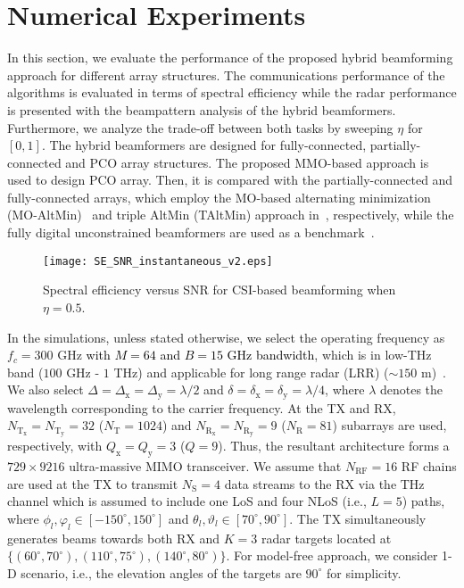 \documentclass[journal,10pt]{IEEEtran}
\begin{document}
	\section{Numerical Experiments}
	\label{sec:numexp}
	In this section, we evaluate the performance of the proposed hybrid beamforming approach for different array structures. The communications performance of the algorithms is evaluated in terms of spectral efficiency while the radar performance is presented with the beampattern analysis of the hybrid beamformers. Furthermore, we analyze the trade-off between both tasks by sweeping $\eta$ for $[0,1]$.  The hybrid beamformers are designed for fully-connected, partially-connected and PCO array structures. The proposed MMO-based approach is used to design PCO array. Then, it is compared with the partially-connected and fully-connected arrays, which employ the MO-based alternating minimization (MO-AltMin)~\cite{hybridBFAltMin} and triple AltMin (TAltMin) approach in~\cite{radarCommLiuICASSP2019}, respectively, while the fully digital unconstrained beamformers are used as a benchmark~\cite{heath2016overview}.
	
	\begin{figure}[t]
		\centering
		{\texttt{[image: SE\_SNR\_instantaneous\_v2.eps]} } 
		\caption{\color{black}Spectral efficiency versus SNR for CSI-based beamforming when $\eta = 0.5$. 
		}
		\label{fig_SE_SNR_ins}
	\end{figure}
	
	
	In the simulations, unless stated otherwise, we select the operating frequency as $f_c = 300$ GHz \textcolor{black}{with $M=64$ and $B=15$ GHz bandwidth}, which is in low-THz band ($100$ GHz - $1$ THz) and applicable for long range radar (LRR) ($\sim 150$ m)~\cite{gashinovaLowTHz1}. We also select $\Delta =\Delta_\mathrm{x} = \Delta_\mathrm{y} = \lambda/2$ and $\delta =\delta_\mathrm{x} = \delta_\mathrm{y} = \lambda/4$, {\color{black}where $\lambda$ denotes the wavelength corresponding to the carrier frequency}. At the TX and RX, $N_{\mathrm{T}_\mathrm{x}} = N_{\mathrm{T}_\mathrm{y}} = 32$ ($N_\mathrm{T} = 1024$) and $N_{\mathrm{R}_\mathrm{x}} = N_{\mathrm{R}_\mathrm{y}} = 9$ ($N_\mathrm{R} = 81$) subarrays are used, respectively, with  $Q_\mathrm{x} =Q_\mathrm{y}= 3$ ($Q=9$). Thus, the resultant architecture forms a $729\times 9216$ ultra-massive MIMO transceiver. We assume that $N_\mathrm{RF} = 16$ RF chains are used at the TX to transmit $N_\mathrm{S}=4$ data streams to the RX via the THz channel which is assumed to include {\color{black}one LoS and four NLoS (i.e., $L=5$)} paths, where $\phi_l,\varphi_l \in [-150^\circ,150^\circ]$ and $\theta_l,\vartheta_l \in [70^\circ,90^\circ]$. The TX simultaneously generates beams towards both RX and $K=3$ radar targets located at $\{(60^\circ,70^\circ),(110^\circ,75^\circ),(140^\circ,80^\circ)\}$. For model-free approach, we consider 1-D scenario, i.e., the elevation angles of the targets are $90^\circ$ for simplicity.
	
\end{document}
